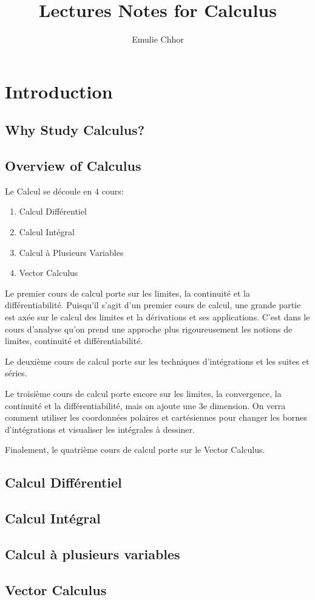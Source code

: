\documentclass{article}
\begin{document}
\title{Lectures Notes for Calculus}
\author{Emulie Chhor}
\maketitle

\section{Introduction}

\subsection{Why Study Calculus?}

\subsection{Overview of Calculus}

Le Calcul se découle en 4 cours:

    \begin{enumerate}
	\item Calcul Différentiel
	\item Calcul Intégral
	\item Calcul à Plusieurs Variables
	\item Vector Calculus
    \end{enumerate}

Le premier cours de calcul porte sur les limites, la continuité et la
différentiabilité. Puisqu'il s'agit d'un premier cours de calcul, une grande
partie est axée sur le calcul des limites et la dérivations et ses applications.
C'est dans le cours d'analyse qu'on prend une approche plus rigoureusement les
notions de limites, continuité et différentiabilité.

Le deuxième cours de calcul porte sur les techniques d'intégrations et les suites
et séries.

Le troisième cours de calcul porte encore sur les limites, la convergence,
la continuité et la différentiabilité, mais on ajoute une 3e dimension. On verra
comment utiliser les coordonnées polaires et cartésiennes pour changer les bornes
d'intégrations et visualiser les intégrales à dessiner.

Finalement, le quatrième cours de calcul porte sur le Vector Calculus.

\subsection{Calcul Différentiel}

\subsection{Calcul Intégral}

\subsection{Calcul à plusieurs variables}

\subsection{Vector Calculus}
\end{document}

